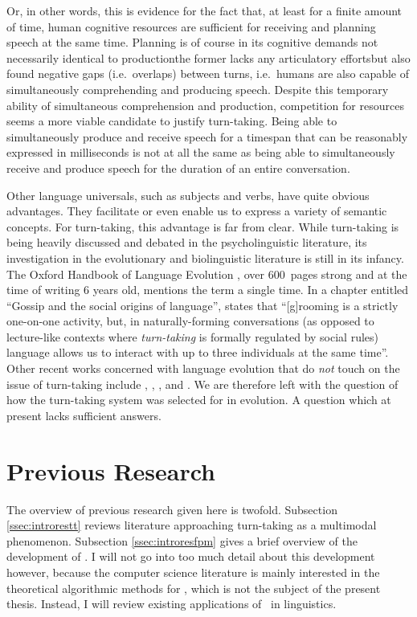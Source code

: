 Or, in other words, this is evidence for the fact that, at least for a finite amount of time, human cognitive resources are sufficient for receiving and planning speech at the same time.
Planning is of course in its cognitive demands not necessarily identical to production\dash the former lacks any articulatory efforts\dash but \citet{levinson_timing_2015} also found negative gaps (i.e.~overlaps) between turns, i.e.~humans are also capable of simultaneously comprehending and producing speech.
Despite this temporary ability of simultaneous comprehension and production, competition for resources seems a more viable candidate to justify turn-taking.
Being able to simultaneously produce and receive speech for a timespan that can be reasonably expressed in milliseconds is not at all the same as being able to simultaneously receive and produce speech for the duration of an entire conversation.

Other language universals, such as subjects and verbs, have quite obvious advantages.
They facilitate or even enable us to express a variety of semantic concepts.
For turn-taking, this advantage is far from clear.
While turn-taking is being heavily discussed and debated in the psycholinguistic literature, its investigation in the evolutionary and biolinguistic literature is still in its infancy.
The Oxford Handbook of Language Evolution \citep{tallerman_oxford_2012}, over 600~pages strong and at the time of writing 6 years old, mentions the term a single time.
In a chapter entitled ``Gossip and the social origins of language'', \citet[, emphasis mine]{dunbar_gossip_2012} states that ``[g]rooming is a strictly one-on-one activity, but, in naturally-forming conversations (as opposed to lecture-like contexts where \emph{turn-taking} is formally regulated by social rules) language allows us to interact with up to three individuals at the same time''.
Other recent works concerned with language evolution that do \emph{not} touch on the issue of turn-taking include \citet{berwick_why_2016}, \citet{bolhuis_birdsong_2013}, \citet{friederici_language_2017}, and \citet{jenkins_biolinguistics_2000}.
We are therefore left with the question of how the turn-taking system was selected for in evolution.
A question which at present lacks sufficient answers.




\section{Previous Research}
\label{sec:introres}
The overview of previous research given here is twofold. Subsection \ref{ssec:introrestt} reviews literature approaching turn-taking as a multimodal phenomenon.
Subsection \ref{ssec:introresfpm} gives a brief overview of the development of \fpmlower.
I will not go into too much detail about this development however, because the computer science literature is mainly interested in the theoretical algorithmic methods for \fpmlower, which is not the subject of the present thesis.
Instead, I will review existing applications of \fpmlower\ in linguistics.


